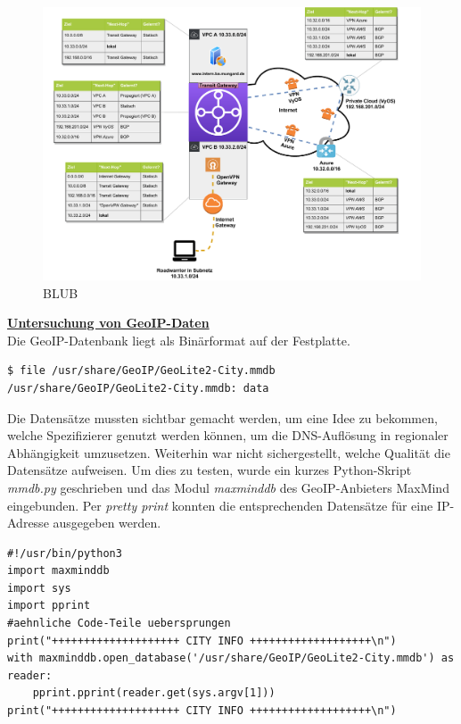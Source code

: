 \begin{figure}[h]
  \centering
  \includegraphics[scale=0.75]{Figures/Use-Case-2_AWS_TGW_Route-Tables.pdf}
  \caption{BLUB}
  \label{grafik:aws_tgw_route_tables}
\end{figure}\FloatBarrier


\textbf{\underline{Untersuchung von GeoIP-Daten}}\\
Die GeoIP-Datenbank liegt als Binärformat auf der Festplatte.

\begin{lstlisting}[label=tf-remote-state-import,caption=.]
$ file /usr/share/GeoIP/GeoLite2-City.mmdb
/usr/share/GeoIP/GeoLite2-City.mmdb: data
\end{lstlisting}

Die Datensätze mussten \glqq sichtbar\grqq{} gemacht werden, um eine Idee zu bekommen, welche Spezifizierer genutzt werden können, um die DNS-Auflösung in regionaler Abhängigkeit umzusetzen. Weiterhin war nicht sichergestellt, welche Qualität die Datensätze aufweisen. Um dies zu testen, wurde ein kurzes Python-Skript \textit{mmdb.py} geschrieben und das Modul \textit{maxminddb} des GeoIP-Anbieters MaxMind eingebunden. Per \textit{pretty print} konnten die entsprechenden Datensätze für eine IP-Adresse ausgegeben werden.

\begin{lstlisting}[label=mmdb-code-example,caption=.]
#!/usr/bin/python3
import maxminddb
import sys
import pprint
#aehnliche Code-Teile uebersprungen
print("++++++++++++++++++++ CITY INFO +++++++++++++++++++\n")
with maxminddb.open_database('/usr/share/GeoIP/GeoLite2-City.mmdb') as reader:
    pprint.pprint(reader.get(sys.argv[1]))
print("++++++++++++++++++++ CITY INFO +++++++++++++++++++\n")
\end{lstlisting}

